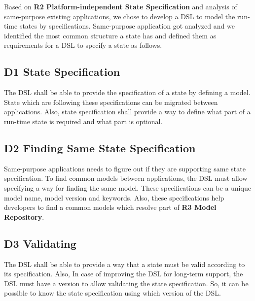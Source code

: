 Based on \textbf{R2 Platform-independent State Specification} and analysis of same-purpose existing applications, we chose to develop a DSL to model the run-time states by specifications. 
Same-purpose application got analyzed and we identified the most common structure a state has and defined them as requirements for a DSL to specify a state as follows.


\subsection{D1 State Specification}
The DSL shall be able to provide the specification of a state by defining a model. State which are following these specifications can be migrated between applications. Also, state specification shall provide a way to define what part of a run-time state is required and what part is optional.

\subsection{D2 Finding Same State Specification}
Same-purpose applications needs to figure out if they are supporting same state specification. To find common models between applications, the DSL must allow specifying a way for finding the same model. These specifications can be a unique model name, model version and keywords. Also, these specifications help developers to find a common models which resolve part of \textbf{R3 Model Repository}.

\subsection{D3 Validating}    
The DSL shall be able to provide a way that a state must be valid according to its specification. Also, In case of improving the DSL for long-term support, the DSL must have a version to allow validating the state specification. So, it can be possible to know the state specification using which version of the DSL.